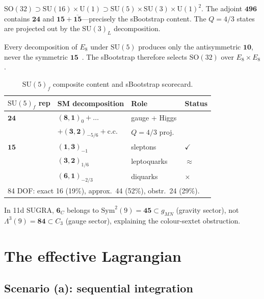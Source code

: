 \documentclass[12pt,a4paper]{article}
\newcommand{\SU}{\mathrm{SU}}
\newcommand{\UU}{\mathrm{U}}
\newcommand{\SO}{\mathrm{SO}}
\begin{document}
$\SO(32) \supset \SU(16) \times \UU(1) \supset \SU(5) \times
\SU(3) \times \UU(1)^2$.
The adjoint $\mathbf{496}$ contains $\mathbf{24}$ and
$\mathbf{15} + \overline{\mathbf{15}}$---precisely the
sBootstrap content.
The $Q = 4/3$ states are projected out by the $\SU(3)_L$
decomposition.

Every decomposition of $E_8$ under $\SU(5)$ produces only the
antisymmetric $\mathbf{10}$, never the symmetric
$\mathbf{15}$~\cite{Rivero:2024epjc}.
The sBootstrap therefore selects $\SO(32)$ over
$E_8 \times E_8$.

\begin{table}[ht]
\centering\small
\caption{$\SU(5)_f$ composite content and sBootstrap scorecard.}
\label{tab:SU5_scorecard}
\begin{tabular}{llll}
\hline
$\SU(5)_f$ rep & SM decomposition & Role & Status \\
\hline
$\mathbf{24}$ & $(\mathbf{8},\mathbf{1})_0 + \ldots$ & gauge + Higgs & \\
  & $+ (\mathbf{3},\mathbf{2})_{-5/6} + \text{c.c.}$ & $Q{=}4/3$ proj.\ & \\
$\mathbf{15}$ & $(\mathbf{1},\mathbf{3})_{-1}$ & sleptons & $\checkmark$ \\
  & $(\mathbf{3},\mathbf{2})_{1/6}$ & leptoquarks & $\approx$ \\
  & $(\mathbf{6},\mathbf{1})_{-2/3}$ & diquarks & $\times$ \\
\hline
\multicolumn{4}{l}{84 DOF: exact 16 (19\%), approx.\ 44 (52\%), obstr.\ 24 (29\%).} \\
\hline
\end{tabular}
\end{table}

In 11d SUGRA, $\mathbf{6}_C$ belongs to
$\mathrm{Sym}^2(9) = \mathbf{45} \subset g_{MN}$ (gravity
sector), not $\Lambda^3(9) = \mathbf{84} \subset C_3$ (gauge
sector), explaining the colour-sextet obstruction.


\section{The effective Lagrangian}
\label{sec:lagrangian}

\subsection{Scenario (a): sequential integration}
\end{document}
